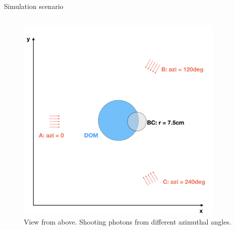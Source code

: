\begin{frame}[fragile]{Simulation scenario}
\begin{columns}
\begin{column}{0.5\textwidth}
\begin{figure}
        \includegraphics[width=0.9\textwidth]{img/summerscenario-003}
        \caption{View from above. Shooting photons from different azimuthal angles.}
      \end{figure}
    \end{column}
  \end{columns}
\end{frame}

